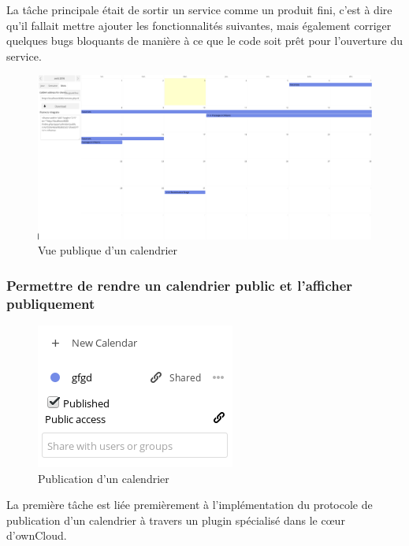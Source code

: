 \documentclass[10pt,a4paper, twoside]{report}
\begin{document}
	La tâche principale était de sortir un service comme un produit fini, c'est à dire qu'il fallait mettre ajouter les fonctionnalités suivantes, mais également corriger quelques bugs bloquants de manière à ce que le code soit prêt pour l'ouverture du service.
	
	\begin{figure}[h]
		\centering
		\centerline{\includegraphics[width=1.5\textwidth]{images/calendrier-vue-publique.png}}
		\caption{Vue publique d'un calendrier}
		\label{vue-publique-calendrier}
	\end{figure}
	
	\subsubsection{Permettre de rendre un calendrier public et l'afficher publiquement}
	
	\begin{figure}
		\begin{center}
		\includegraphics[width=0.3\paperwidth]{images/fonctionnalitepublie.png}
	\end{center}
		\caption{Publication d'un calendrier}
		\label{publication-calendrier}
	\end{figure}
	
	La première tâche est liée premièrement à l'implémentation du protocole de publication d'un calendrier à travers un plugin spécialisé dans le cœur d'ownCloud. 
	
\end{document}
